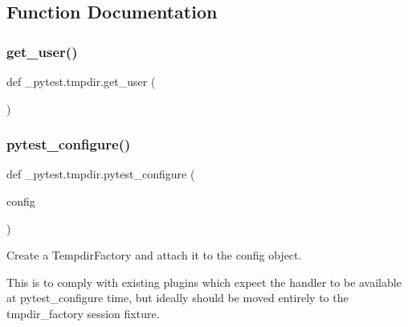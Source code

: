 \subsection{Function Documentation}
\mbox{\label{namespace__pytest_1_1tmpdir_a80baa4aa8cdd5cd6281045ca35cea7f5}} 
\subsubsection{\texorpdfstring{get\+\_\+user()}{get\_user()}}
{\footnotesize\ttfamily def \+\_\+pytest.\+tmpdir.\+get\+\_\+user (\begin{DoxyParamCaption}{ }\end{DoxyParamCaption})}

 \mbox{\label{namespace__pytest_1_1tmpdir_aa9a6001be9c67be1e73b9efd97b15ab6}} 
\subsubsection{\texorpdfstring{pytest\+\_\+configure()}{pytest\_configure()}}
{\footnotesize\ttfamily def \+\_\+pytest.\+tmpdir.\+pytest\+\_\+configure (\begin{DoxyParamCaption}\item[{}]{config }\end{DoxyParamCaption})}

\begin{DoxyVerb}Create a TempdirFactory and attach it to the config object.

This is to comply with existing plugins which expect the handler to be
available at pytest_configure time, but ideally should be moved entirely
to the tmpdir_factory session fixture.
\end{DoxyVerb}
 \mbox{\label{namespace__pytest_1_1tmpdir_ad998371dbf1bf308a2fc1b20b5367ed6}} 
